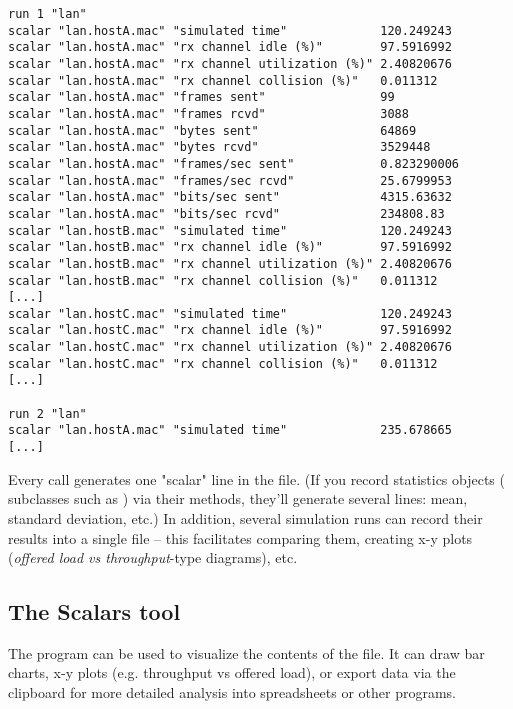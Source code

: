 \begin{verbatim}
run 1 "lan"
scalar "lan.hostA.mac" "simulated time"             120.249243
scalar "lan.hostA.mac" "rx channel idle (%)"        97.5916992
scalar "lan.hostA.mac" "rx channel utilization (%)" 2.40820676
scalar "lan.hostA.mac" "rx channel collision (%)"   0.011312
scalar "lan.hostA.mac" "frames sent"                99
scalar "lan.hostA.mac" "frames rcvd"                3088
scalar "lan.hostA.mac" "bytes sent"                 64869
scalar "lan.hostA.mac" "bytes rcvd"                 3529448
scalar "lan.hostA.mac" "frames/sec sent"            0.823290006
scalar "lan.hostA.mac" "frames/sec rcvd"            25.6799953
scalar "lan.hostA.mac" "bits/sec sent"              4315.63632
scalar "lan.hostA.mac" "bits/sec rcvd"              234808.83
scalar "lan.hostB.mac" "simulated time"             120.249243
scalar "lan.hostB.mac" "rx channel idle (%)"        97.5916992
scalar "lan.hostB.mac" "rx channel utilization (%)" 2.40820676
scalar "lan.hostB.mac" "rx channel collision (%)"   0.011312
[...]
scalar "lan.hostC.mac" "simulated time"             120.249243
scalar "lan.hostC.mac" "rx channel idle (%)"        97.5916992
scalar "lan.hostC.mac" "rx channel utilization (%)" 2.40820676
scalar "lan.hostC.mac" "rx channel collision (%)"   0.011312
[...]

run 2 "lan"
scalar "lan.hostA.mac" "simulated time"             235.678665
[...]
\end{verbatim}

Every  call generates one "scalar" line in the file.
(If you record statistics objects ( subclasses
such as ) via their  methods,
they'll generate several lines: mean, standard deviation, etc.)
In addition, several simulation runs can record their results into a single file --
this facilitates comparing them, creating x-y plots
(\textit{offered load vs throughput}-type diagrams), etc.



\subsection{The Scalars tool}

The  program can be used to visualize the contents of the
 file. It can draw bar charts, x-y plots
(e.g. throughput vs offered load), or export data via the clipboard
for more detailed analysis into spreadsheets or other programs.

